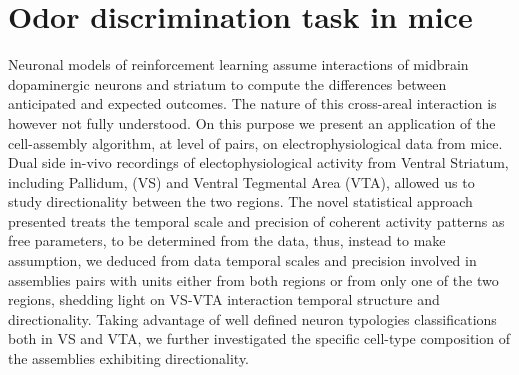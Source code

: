 \chapter{Odor discrimination task in mice}
\label{chap:MaxData}
Neuronal models of reinforcement learning assume interactions of midbrain dopaminergic neurons and striatum to compute the differences between anticipated and expected outcomes. The nature of this cross-areal interaction is however not fully understood. On this purpose we present an application of the cell-assembly algorithm, at level of pairs, on electrophysiological data from mice.
Dual side in-vivo recordings of electophysiological activity from Ventral Striatum, including Pallidum, (VS) and Ventral Tegmental Area (VTA), allowed us to study directionality between the two regions.
The novel statistical approach presented treats the temporal scale and precision of coherent activity patterns as free parameters, to be determined from the data, thus, instead to make assumption, we deduced from data temporal scales and precision involved in assemblies pairs with units either from both regions or from only one of the two regions, shedding light on VS-VTA interaction temporal structure and directionality.
Taking advantage of well defined neuron typologies classifications both in VS and VTA, we further investigated the specific cell-type composition of the assemblies exhibiting directionality. 
